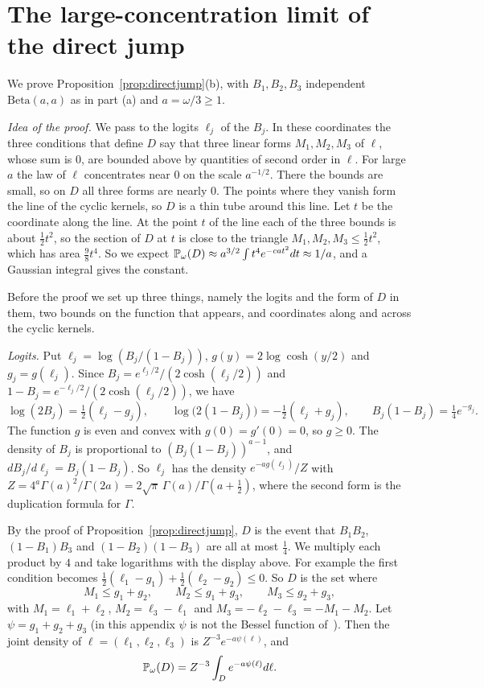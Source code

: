 \section{The large-concentration limit of the direct jump}\label{app:hdp}

We prove Proposition~\ref{prop:directjump}(b), with $B_1,B_2,B_3$ independent
$\mathrm{Beta}(a,a)$ as in part (a) and $a=\omega/3\ge1$.

\emph{Idea of the proof.} We pass to the logits $\ell_j$ of the $B_j$. In
these coordinates the three conditions that define $D$ say that three linear
forms $M_1,M_2,M_3$ of $\ell$, whose sum is $0$, are bounded above by
quantities of second order in $\ell$. For large $a$ the law of $\ell$
concentrates near $0$ on the scale $a^{-1/2}$. There the bounds are small, so
on $D$ all three forms are nearly $0$. The points where they vanish form the
line of the cyclic kernels, so $D$ is a thin tube around this line. Let $t$ be
the coordinate along the line. At the point $t$ of the line each of the three
bounds is about $\frac12t^2$, so the section of $D$ at $t$ is close to the
triangle $M_1,M_2,M_3\le\frac12t^2$, which has area $\frac98t^4$. So we expect
$\mathbb P_\omega(D)\approx a^{3/2}\int t^4e^{-cat^2}dt\approx1/a$, and a Gaussian
integral gives the constant.

Before the proof we set up three things, namely the logits and the form of $D$
in them, two bounds on the function that appears, and coordinates along and
across the cyclic kernels.

\emph{Logits.} Put $\ell_j=\log(B_j/(1-B_j))$, $g(y)=2\log\cosh(y/2)$ and
$g_j=g(\ell_j)$. Since $B_j=e^{\ell_j/2}/(2\cosh(\ell_j/2))$ and
$1-B_j=e^{-\ell_j/2}/(2\cosh(\ell_j/2))$, we have
\[
 \log(2B_j)=\tfrac12(\ell_j-g_j),\qquad
 \log\bigl(2(1-B_j)\bigr)=-\tfrac12(\ell_j+g_j),\qquad
 B_j(1-B_j)=\tfrac14e^{-g_j}.
\]
The function $g$ is even and convex with $g(0)=g'(0)=0$, so $g\ge0$. The
density of $B_j$ is proportional to $(B_j(1-B_j))^{a-1}$, and
$dB_j/d\ell_j=B_j(1-B_j)$. So $\ell_j$ has the density $e^{-ag(\ell_j)}/Z$ with
$Z=4^a\Gamma(a)^2/\Gamma(2a)=2\sqrt\pi\,\Gamma(a)/\Gamma(a+\frac12)$, where the
second form is the duplication formula for $\Gamma$.

By the proof of Proposition~\ref{prop:directjump}, $D$ is the event that
$B_1B_2$, $(1-B_1)B_3$ and $(1-B_2)(1-B_3)$ are all at most $\frac14$. We
multiply each product by $4$ and take logarithms with the display above. For
example the first condition becomes
$\frac12(\ell_1-g_1)+\frac12(\ell_2-g_2)\le0$. So $D$ is the set where
\begin{equation}\label{eq:hdp-constraints}
 M_1\le g_1+g_2,\qquad M_2\le g_1+g_3,\qquad M_3\le g_2+g_3,
\end{equation}
with $M_1=\ell_1+\ell_2$, $M_2=\ell_3-\ell_1$ and
$M_3=-\ell_2-\ell_3=-M_1-M_2$. Let $\psi=g_1+g_2+g_3$ (in this appendix $\psi$
is not the Bessel function of~\cite{paperC}). Then the joint density
of $\ell=(\ell_1,\ell_2,\ell_3)$ is $Z^{-3}e^{-a\psi(\ell)}$, and
\begin{equation}\label{eq:hdp-integral}
 \mathbb P_\omega(D)=Z^{-3}\int_De^{-a\psi(\ell)}d\ell.
\end{equation}

